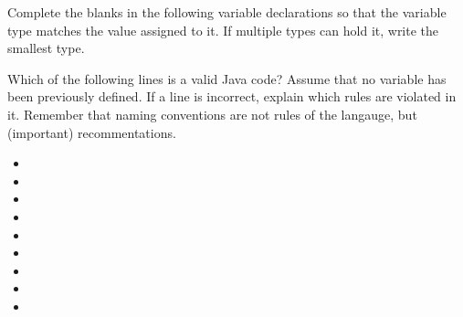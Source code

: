 \exercisesection

\begin{exercise}
Complete the blanks in the following variable declarations so that the variable type matches the value assigned to it. If multiple types can hold it, write the smallest type.
\item {}
\item {}
\item {}
\item {}
\item {}
\item {}
\end{exercise}

\begin{exercise}
Which of the following lines is a valid Java code? Assume that no variable has been previously defined. If a line is incorrect, explain which rules are violated in it. Remember that naming conventions are not rules of the langauge, but (important) recommentations.
\begin{itemize}
\item {}
\item {}
\item {}
\item {}
\item {}
\item {}
\item {}
\item {}
\item {}
\end{itemize}
\end{exercise}

